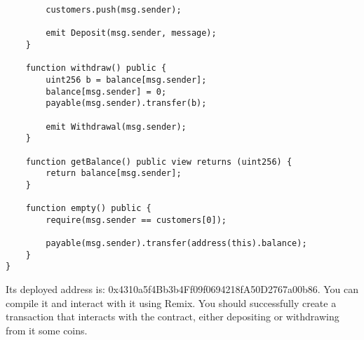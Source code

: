 \documentclass[12pt,addpoints,answers]{exam}
\begin{document}
\begin{questions}
{\begin{verbatim}
        customers.push(msg.sender);

        emit Deposit(msg.sender, message);
    }

    function withdraw() public {
        uint256 b = balance[msg.sender];
        balance[msg.sender] = 0;
        payable(msg.sender).transfer(b);

        emit Withdrawal(msg.sender);
    }

    function getBalance() public view returns (uint256) {
        return balance[msg.sender];
    }

    function empty() public {
        require(msg.sender == customers[0]);

        payable(msg.sender).transfer(address(this).balance);
    }
}
\end{verbatim}

} %

 Its deployed address is: 0x4310a5f4Bb3b4Ff09f0694218fA50D2767a00b86. You can compile it and interact with it using Remix. You should successfully create a transaction that interacts with the contract, either depositing or withdrawing from it some coins.


\newpage

~\\

\end{questions}
\end{document}
